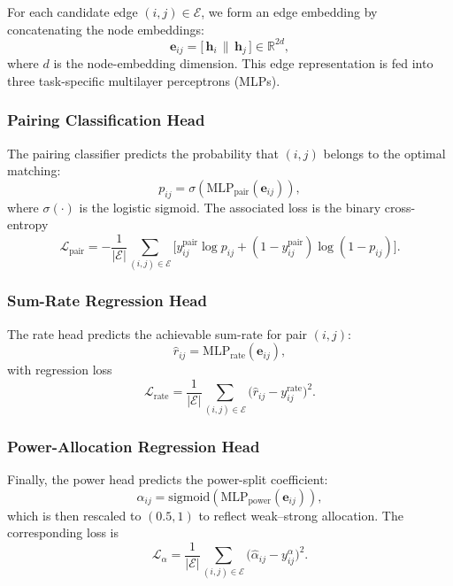 For each candidate edge $(i,j) \in \mathcal{E}$, we form an edge embedding by concatenating the node embeddings:
\begin{equation}
\mathbf{e}_{ij} = 
\big[\, \mathbf{h}_i \,\|\, \mathbf{h}_j \,\big] 
\in \mathbb{R}^{2d},
\end{equation}
where $d$ is the node-embedding dimension. This edge representation is fed into three task-specific multilayer perceptrons (MLPs).

\subsubsection{Pairing Classification Head}

The pairing classifier predicts the probability that $(i,j)$ belongs to the optimal matching:
\begin{equation}
p_{ij} = \sigma\!\left(
\mathrm{MLP}_{\text{pair}}(\mathbf{e}_{ij})
\right),
\end{equation}
where $\sigma(\cdot)$ is the logistic sigmoid. The associated loss is the binary cross-entropy
\begin{equation}
\mathcal{L}_{\text{pair}} =
- \frac{1}{|\mathcal{E}|}
\sum_{(i,j)\in\mathcal{E}}
\Big[
y_{ij}^{\text{pair}} \log p_{ij}
+ (1-y_{ij}^{\text{pair}})\log(1-p_{ij})
\Big].
\end{equation}

\subsubsection{Sum-Rate Regression Head}

The rate head predicts the achievable sum-rate for pair $(i,j)$:
\begin{equation}
\hat{r}_{ij} = 
\mathrm{MLP}_{\text{rate}}(\mathbf{e}_{ij}),
\end{equation}
with regression loss
\begin{equation}
\mathcal{L}_{\text{rate}} =
\frac{1}{|\mathcal{E}|}
\sum_{(i,j)\in\mathcal{E}}
\big(\hat{r}_{ij} - y_{ij}^{\text{rate}}\big)^2.
\end{equation}

\subsubsection{Power-Allocation Regression Head}

Finally, the power head predicts the power-split coefficient:
\begin{equation}
\hat{\alpha}_{ij} =
\mathrm{sigmoid}\!\left(
\mathrm{MLP}_{\text{power}}(\mathbf{e}_{ij})
\right),
\end{equation}
which is then rescaled to $(0.5,1)$ to reflect weak–strong allocation. The corresponding loss is
\begin{equation}
\mathcal{L}_{\alpha} =
\frac{1}{|\mathcal{E}|}
\sum_{(i,j)\in\mathcal{E}}
\big(\hat{\alpha}_{ij} - y_{ij}^{\alpha}\big)^2.
\end{equation}

